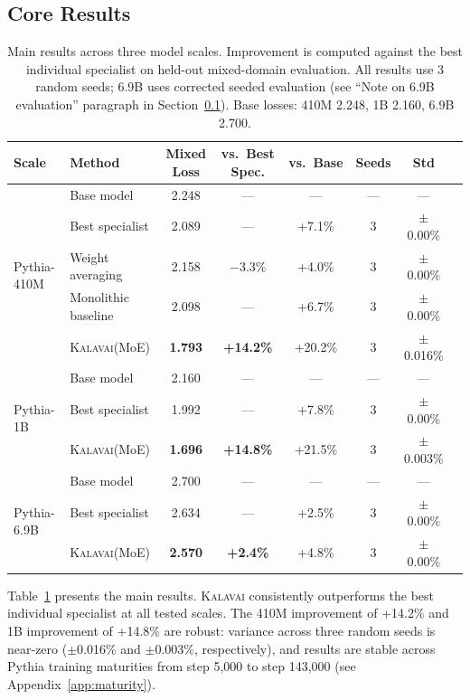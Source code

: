 \documentclass{article}
\newcommand{\kalavai}{\textsc{Kalavai}\xspace}
\begin{document}
\subsection{Core Results}
\label{sec:core}

\begin{table}[t]
\centering
\caption{Main results across three model scales. Improvement is computed against the best individual specialist on held-out mixed-domain evaluation. All results use 3 random seeds; 6.9B uses corrected seeded evaluation (see ``Note on 6.9B evaluation'' paragraph in Section~\ref{sec:core}). Base losses: 410M 2.248, 1B 2.160, 6.9B 2.700.}
\label{tab:main}
\begin{tabular}{llcccccc}
\toprule
\textbf{Scale} & \textbf{Method} & \textbf{Mixed Loss} & \textbf{vs.\ Best Spec.} & \textbf{vs.\ Base} & \textbf{Seeds} & \textbf{Std} \\
\midrule
\multirow{5}{*}{Pythia-410M}
 & Base model          & 2.248 & ---     & ---     & ---  & ---       \\
 & Best specialist     & 2.089 & ---     & +7.1\%  & 3    & $\pm$0.00\% \\
 & Weight averaging    & 2.158 & $-$3.3\% & +4.0\% & 3    & $\pm$0.00\% \\
 & Monolithic baseline & 2.098 & ---     & +6.7\%  & 3    & $\pm$0.00\% \\
 & \kalavai (MoE)      & \textbf{1.793} & \textbf{+14.2\%} & +20.2\% & 3 & $\pm$0.016\% \\
\midrule
\multirow{3}{*}{Pythia-1B}
 & Base model          & 2.160 & ---     & ---     & ---  & ---        \\
 & Best specialist     & 1.992 & ---     & +7.8\%  & 3    & $\pm$0.00\% \\
 & \kalavai (MoE)      & \textbf{1.696} & \textbf{+14.8\%} & +21.5\% & 3 & $\pm$0.003\% \\
\midrule
\multirow{3}{*}{Pythia-6.9B}
 & Base model          & 2.700 & ---     & ---     & ---  & ---        \\
 & Best specialist     & 2.634 & ---     & +2.5\%  & 3    & $\pm$0.00\% \\
 & \kalavai (MoE)      & \textbf{2.570} & \textbf{+2.4\%}  & +4.8\%  & 3 & $\pm$0.00\% \\
\bottomrule
\end{tabular}
\end{table}

Table~\ref{tab:main} presents the main results. \kalavai consistently outperforms the best individual specialist at all tested scales. The 410M improvement of +14.2\% and 1B improvement of +14.8\% are robust: variance across three random seeds is near-zero ($\pm$0.016\% and $\pm$0.003\%, respectively), and results are stable across Pythia training maturities from step 5,000 to step 143,000 (see Appendix~\ref{app:maturity}).
\end{document}
